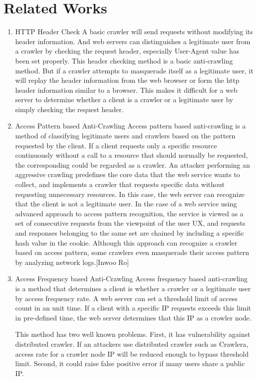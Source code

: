\documentclass[sigconf,anonymous=false]{acmart}
\begin{document}
\section{Related Works}
\begin{enumerate}

\item HTTP Header Check
\newline A basic crawler will send requests without modifying its header information. And web servers can distinguishes a legitimate user from a crawler by checking the request header, especially User-Agent value has been set properly. This header checking method is a basic anti-crawling method.
But if a crawler attempts to masquerade itself as a legitimate user, it will replay the header information from the web browser or form the http header information similar to a browser. This makes it difficult for a web server to determine whether a client is a crawler or a legitimate user by simply checking the request header.
\newline

\item Access Pattern based Anti-Crawling
\newline
Access pattern based anti-crawling is a method of classifying legitimate users and crawlers based on the pattern requested by the client. If a client requests only a specific resource continuously without a call to a resource that should normally be requested, the corresponding could be regarded as a crawler. 
An attacker performing an aggressive crawling predefines the core data that the web service wants to collect, and implements a crawler that requests specific data without requesting unnecessary resources. In this case, the web server can recognize that the client is not a legitimate user.
In the case of a web service using advanced approach to access pattern recognition, the service is viewed as a set of consecutive requests from the viewpoint of the user UX, and requests and responses belonging to the same set are chained by including a specific hash value in the cookie.
Although this approach can recognize a crawler based on access pattern, some crawlers even masquerade their access pattern by analyzing network logs.[Inwoo Ro] 
\newline 
\item Access Frequency based Anti-Crawling
\newline 
Access frequency based anti-crawling is a method that determines a client is whether a crawler or a legitimate user by access frequency rate. A web server can set a threshold limit of access count in an unit time. If a client with a specific IP requests exceeds this limit in pre-defined time, the web server determines that this IP as a crowler node.

This method has two well known problems. 
First, it has vulnerability against distributed crawler. If an attackers use distributed crawler such as Crawlera, access rate for a crawler node IP will be reduced enough to bypass threshold limit.
Second, it could raise false positive error if many users share a public IP.
\newline


\end{enumerate}
\end{document}
